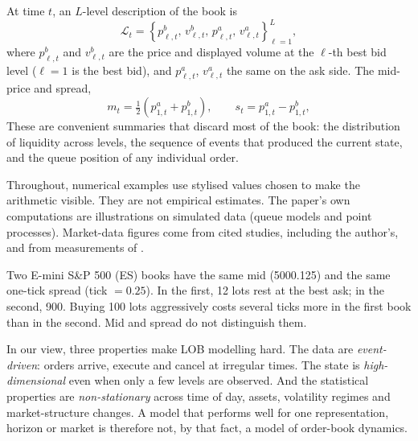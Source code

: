 At time $t$, an $L$-level description of the book is
\begin{equation}
  \mathcal{L}_t = \left\{ p^{b}_{\ell,t},\, v^{b}_{\ell,t},\, p^{a}_{\ell,t},\, v^{a}_{\ell,t}
  \right\}_{\ell=1}^{L},
  \label{eq:lob-state}
\end{equation}
where $p^{b}_{\ell,t}$ and $v^{b}_{\ell,t}$ are the price and displayed volume at the $\ell$-th best
bid level ($\ell = 1$ is the best bid), and $p^{a}_{\ell,t}$, $v^{a}_{\ell,t}$ the same on the ask side.
The mid-price and
spread,
\begin{equation}
  m_t = \tfrac12\left(p^{a}_{1,t}+p^{b}_{1,t}\right), \qquad s_t = p^{a}_{1,t}-p^{b}_{1,t},
\end{equation}
These are convenient summaries that discard most of the book: the distribution of liquidity across
levels, the sequence of events that produced the current state, and the queue position of any
individual order.

Throughout, numerical examples use stylised values chosen to make the arithmetic visible. They are
not empirical estimates. The paper's own computations are illustrations on simulated data (queue models and point processes).
Market-data figures come from cited studies, including the author's, and from measurements of \kasparhft{}.

\begin{example}
Two E-mini S\&P 500 (ES) books have the same mid (5000.125) and the same one-tick spread (tick
$=0.25$). In the first, 12 lots rest at the best ask; in the second, 900. Buying 100 lots
aggressively costs several ticks more in the first book than in the second. Mid and spread do not
distinguish them.
\end{example}

In our view, three properties make LOB modelling hard. The data are \emph{event-driven}: orders arrive,
execute and cancel at irregular times. The state is \emph{high-dimensional} even when only a few
levels are observed. And the statistical properties are \emph{non-stationary} across time of day,
assets, volatility regimes and market-structure changes. A model that performs well for one
representation, horizon or market is therefore not, by that fact, a model of order-book dynamics.

